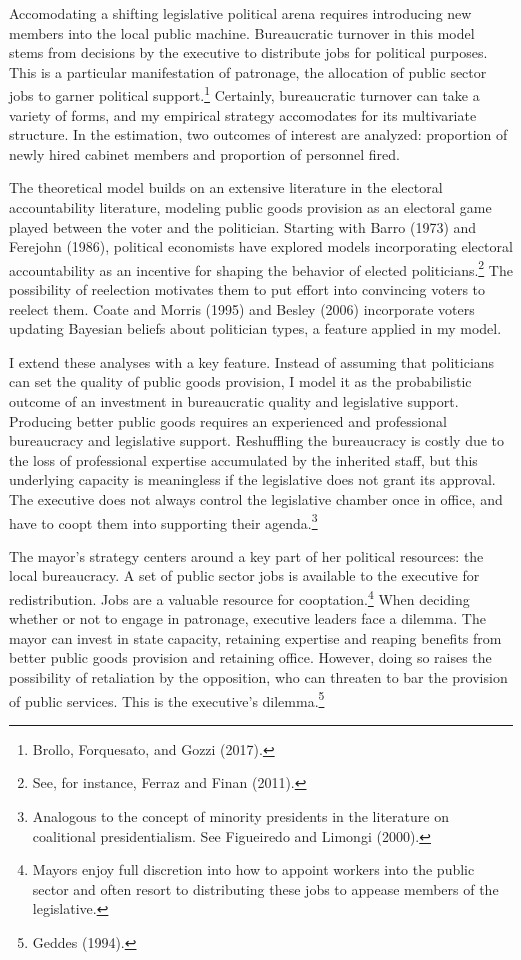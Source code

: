 \documentclass[12pt,]{article}
\let\rmarkdownfootnote\footnote%
\def\footnote{\protect\rmarkdownfootnote}
\begin{document}
Accomodating a shifting legislative political arena requires introducing
new members into the local public machine. Bureaucratic turnover in this
model stems from decisions by the executive to distribute jobs for
political purposes. This is a particular manifestation of patronage, the
allocation of public sector jobs to garner political support.\footnote{Brollo,
  Forquesato, and Gozzi (2017).} Certainly, bureaucratic turnover can
take a variety of forms, and my empirical strategy accomodates for its
multivariate structure. In the estimation, two outcomes of interest are
analyzed: proportion of newly hired cabinet members and proportion of
personnel fired.

The theoretical model builds on an extensive literature in the electoral
accountability literature, modeling public goods provision as an
electoral game played between the voter and the politician. Starting
with Barro (1973) and Ferejohn (1986), political economists have
explored models incorporating electoral accountability as an incentive
for shaping the behavior of elected politicians.\footnote{See, for
  instance, Ferraz and Finan (2011).} The possibility of reelection
motivates them to put effort into convincing voters to reelect them.
Coate and Morris (1995) and Besley (2006) incorporate voters updating
Bayesian beliefs about politician types, a feature applied in my model.

I extend these analyses with a key feature. Instead of assuming that
politicians can set the quality of public goods provision, I model it as
the probabilistic outcome of an investment in bureaucratic quality and
legislative support. Producing better public goods requires an
experienced and professional bureaucracy and legislative support.
Reshuffling the bureaucracy is costly due to the loss of professional
expertise accumulated by the inherited staff, but this underlying
capacity is meaningless if the legislative does not grant its approval.
The executive does not always control the legislative chamber once in
office, and have to coopt them into supporting their agenda.\footnote{Analogous
  to the concept of minority presidents in the literature on coalitional
  presidentialism. See Figueiredo and Limongi (2000).}

The mayor's strategy centers around a key part of her political
resources: the local bureaucracy. A set of public sector jobs is
available to the executive for redistribution. Jobs are a valuable
resource for cooptation.\footnote{Mayors enjoy full discretion into how
  to appoint workers into the public sector and often resort to
  distributing these jobs to appease members of the legislative.} When
deciding whether or not to engage in patronage, executive leaders face a
dilemma. The mayor can invest in state capacity, retaining expertise and
reaping benefits from better public goods provision and retaining
office. However, doing so raises the possibility of retaliation by the
opposition, who can threaten to bar the provision of public services.
This is the executive's dilemma.\footnote{Geddes (1994).}
\end{document}
